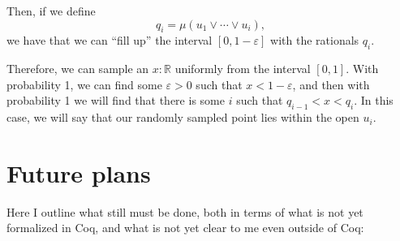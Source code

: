 \documentclass{article}           %
\newcommand{\R}{\mathbb{R}}
\begin{document}
Then, if we define
\[
q_i = \mu(u_1 \vee \cdots \vee u_i),
\]
we have that we can ``fill up'' the interval $[0, 1 - \varepsilon]$ with the rationals $q_i$.

Therefore, we can sample an $x : \R$ uniformly from the interval $[0, 1]$. With probability 1, we can find some $\varepsilon > 0$ such that $x < 1 - \varepsilon$, and then with probability 1 we will find that there is some $i$ such that $q_{i-1} < x < q_i$. In this case, we will say that our randomly sampled point lies within the open $u_i$.

\section{Future plans}

Here I outline what still must be done, both in terms of what is not yet formalized in Coq, and what is not yet clear to me even outside of Coq:
\end{document}
